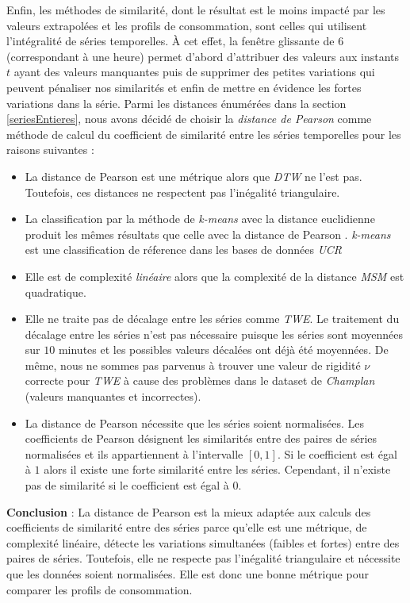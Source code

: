 Enfin, les m\'ethodes de similarit\'e, dont le r\'esultat est le moins impact\'e par les valeurs extrapol\'ees et les profils de consommation, sont celles qui utilisent l'int\'egralit\'e de s\'eries temporelles. \`A cet effet, la fen\^etre glissante de $6$ (correspondant \`a une heure) permet d'abord d'attribuer des valeurs aux instants $t$ ayant des valeurs manquantes puis de supprimer des petites variations qui peuvent p\'enaliser nos similarit\'es et enfin de mettre en \'evidence les fortes variations dans la s\'erie.
Parmi les distances \'enum\'er\'ees dans la section \ref{seriesEntieres}, nous avons d\'ecid\'e de choisir la {\em distance de Pearson} comme m\'ethode de calcul du coefficient de  similarit\'e entre les s\'eries temporelles  pour les raisons suivantes :
\begin{itemize}
	\item La distance de Pearson est une m\'etrique alors que {\em DTW} ne l'est pas. Toutefois, ces distances ne respectent pas l'in\'egalit\'e triangulaire.
	\item La classification par la m\'ethode de {\em k-means} avec la distance euclidienne produit les m\^emes r\'esultats que celle avec la distance de Pearson \cite{berthold2016clusteringDistancePearson}. {\em k-means} est une classification de r\'eference dans les bases de donn\'ees {\em UCR} \cite{keogh2002UCR} 
	\item Elle est de complexit\'e {\em lin\'eaire} alors que la complexit\'e de la distance {\em MSM} est quadratique.
	\item Elle ne traite pas de d\'ecalage entre les s\'eries comme {\em TWE}. Le traitement du d\'ecalage entre les s\'eries n'est pas n\'ecessaire puisque les s\'eries sont moyenn\'ees sur $10$ minutes et les possibles valeurs d\'ecal\'ees ont d\'ej\`a \'et\'e moyenn\'ees. De m\^eme, nous ne sommes pas parvenus \`a trouver une valeur de rigidit\'e $\nu$ correcte pour {\em TWE} \`a cause des probl\`emes dans le dataset de {\em Champlan} (valeurs manquantes et incorrectes). 
	\item La distance de Pearson n\'ecessite que les s\'eries soient normalis\'ees. Les coefficients de Pearson d\'esignent les similarit\'es entre des paires de s\'eries normalis\'ees et ils appartiennent \`a l'intervalle $[0,1]$.  Si le coefficient est \'egal \`a $1$ alors il existe une forte similarit\'e entre les s\'eries. Cependant, il n'existe pas de similarit\'e si le coefficient est  \'egal \`a $0$.
\end{itemize}


{\bf Conclusion} : 
La distance de Pearson est la mieux adapt\'ee aux calculs des coefficients de similarit\'e entre des s\'eries parce qu'elle est une m\'etrique, de complexit\'e lin\'eaire, d\'etecte les variations simultan\'ees (faibles et fortes) entre des paires de s\'eries. Toutefois, elle ne respecte pas l'in\'egalit\'e triangulaire et n\'ecessite que les donn\'ees soient normalis\'ees. Elle est donc une bonne m\'etrique pour comparer les profils de consommation.